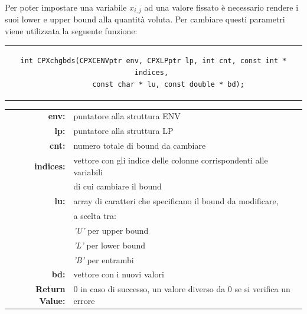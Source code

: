 \vspace{2 cm}
Per poter impostare una variabile $x_{i,j}$ ad una valore fissato è necessario rendere i suoi lower e upper bound alla quantità voluta. Per cambiare questi parametri viene utilizzata la seguente funzione: 
\begin{center}
\begin{tabular}{c}
\begin{lstlisting}[linewidth=375pt, basicstyle=\footnotesize\sffamily,]   
int CPXchgbds(CPXCENVptr env, CPXLPptr lp, int cnt, const int * indices, 
		const char * lu, const double * bd); 
\end{lstlisting}
\end{tabular}
\end{center}
\begin{table}[h]
\centering
\begin{tabular}{rl}
\textbf{env:} & {puntatore alla struttura ENV}\\
\textbf{lp:} & {puntatore alla struttura LP}\\
\textbf{cnt:} & {numero totale di bound da cambiare}\\
\textbf{indices:} & {vettore con gli indice delle colonne corrispondenti alle variabili}\\
&{di cui cambiare il bound}\\
\textbf{lu:} & {array di caratteri che specificano il bound da modificare,}\\
&{a scelta tra:}\\
&{\textit{'U'} per upper bound}\\
&{\textit{'L'} per lower bound}\\
&{\textit{'B'} per entrambi}\\
\textbf{bd:} & {vettore con i nuovi valori}\\
\textbf{Return Value:} & {0 in caso di successo, un valore diverso da 0 se si verifica un errore}\\
\end{tabular}
\end{table}
